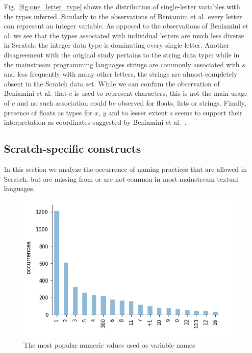 \documentclass[conference]{IEEEtran}
\begin{document}

Fig.~\ref{fig:one_letter_type} shows the distribution of single-letter variables with the types inferred. 
Similarly to the observations of Beniamini et al. every letter can represent an integer variable.
As opposed to the observations of Beniamini et al. we see that the types associated with individual letters are much less diverse in Scratch: the integer data type is dominating every single letter.
Another disagreement with the original study pertains to the string data type: while in the mainstream programming languages strings are commonly associated with $s$ and less frequently with many other letters, the strings are almost completely absent in the Scratch data set.
While we can confirm the observation of Beniamini et al. that $c$ is used to represent characters, this is not the main usage of $c$ and no such association could be observed for floats, lists or strings.
Finally, presence of floats as types for $x$, $y$ and to lesser extent $z$ seems to support their interpretation as coordinates suggested by Beniamini et al.~\cite{Beniamini}.

\subsection{Scratch-specific constructs}
\label{res:Scratch:specific}
In this section we analyze the occurrence of naming practices that are allowed in Scratch, but are missing from or are not common in most mainstream textual languages.
\begin{figure}[!b]
	\begin{center}
		\includegraphics[width=\columnwidth]{fig/numeric_as_vars_occurrences}
		\caption{The most popular numeric values used as variable names}
		\label{fig:numeric}
	\end{center}
\end{figure} 
\end{document}
